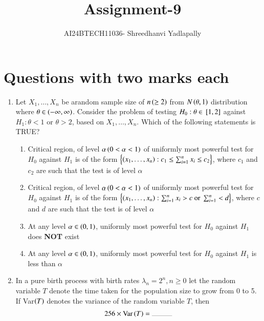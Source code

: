 \documentclass[journal,12pt,onecolumn]{IEEEtran}
\theoremstyle{remark}
\begin{document}

\vspace{3cm}

\title{Assignment-9}
\author{AI24BTECH11036- Shreedhanvi Yadlapally}
\maketitle

\bigskip
\renewcommand{\thefigure}{\theenumi}
\renewcommand{\thetable}{\theenumi}
\section{Questions with two marks each}

\begin{enumerate}

\item Let $X_{1}, \ldots, X_{n}$ be arandom sample size of $n\left(\geq 2\right)$ from $N\left(\theta, 1\right)$ distribution where $\theta \in \left(-\infty, \infty\right)$. Consider the problem of testing $H_{0}: \theta \in {}\left[1,2\right]$ against $H_{1}: \theta < 1$ or $\theta > 2$, based on $X_{1}, \ldots, X_{n}$. Which of the following statements is TRUE?
	\begin{enumerate}
	\item Critical region, of level $\alpha \left(0<\alpha<1\right)$ of uniformly most powerful test for $H_{0}$ against $H_{1}$ is of the form $\left\{\left(x_{1}, \ldots, x_{n}\right): c_{1} \leq \sum_{i=1}^{n}x_{i} \leq c_{2}\right\}$, where $c_{1}$ and $c_{2}$ are such that the test is of level $\alpha$
	\item Critical region, of level $\alpha \left(0<\alpha<1\right)$ of uniformly most powerful test for $H_{0}$ against $H_{1}$ is of the form $\left\{\left(x_{1}, \ldots, x_{n}\right): \sum_{i=1}^{n}x_{i}>c \text{ or } \sum_{i=1}^{n}<d\right\}$, where $c$ and $d$ are such that the test is of level $\alpha$
	\item At any level $\alpha \in \left(0,1\right)$, uniformly most powerful test for $H_{0}$ against $H_{1}$ does \textbf{NOT} exist
	\item At any level $\alpha \in \left(0,1\right)$, uniformly most powerful test for $H_{0}$ against $H_{1}$ is less than $\alpha$	
	\end{enumerate}

\item In a pure birth process with birth rates $\lambda_{n}=2^{n}, n \geq 0$ let the random variable $T$ denote the time taken for the population size to grow from 0 to 5. If Var$\left(T\right)$ denotes the variance of the random variable $T$, then
	\begin{align*}
	 	256 \times \text{Var}\brak{T}= \rule{1cm}{0.2pt}
	\end{align*}


\end{enumerate}
\end{document}
